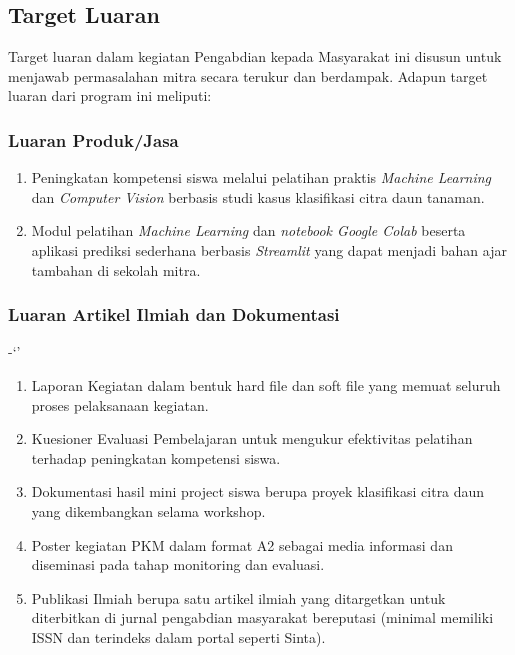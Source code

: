 \subsection{Target Luaran}

Target luaran dalam kegiatan Pengabdian kepada Masyarakat ini disusun untuk menjawab permasalahan mitra secara terukur dan berdampak. Adapun target luaran dari program ini meliputi:

\subsubsection{Luaran Produk/Jasa}
\begin{enumerate}[label=\alph*), leftmargin=*]
    \item Peningkatan kompetensi siswa melalui pelatihan praktis \textit{Machine Learning} dan \textit{Computer Vision} berbasis studi kasus klasifikasi citra daun tanaman.
    \item Modul pelatihan \textit{Machine Learning} dan \textit{notebook Google Colab} beserta aplikasi prediksi sederhana berbasis \textit{Streamlit} yang dapat menjadi bahan ajar tambahan di sekolah mitra.
\end{enumerate}

\subsubsection{Luaran Artikel Ilmiah dan Dokumentasi}-`'
\begin{enumerate}[label=\alph*), leftmargin=*]
    \item Laporan Kegiatan dalam bentuk hard file dan soft file yang memuat seluruh proses pelaksanaan kegiatan.
    \item Kuesioner Evaluasi Pembelajaran untuk mengukur efektivitas pelatihan terhadap peningkatan kompetensi siswa.
    \item Dokumentasi hasil mini project siswa berupa proyek klasifikasi citra daun yang dikembangkan selama workshop.
    \item Poster kegiatan PKM dalam format A2 sebagai media informasi dan diseminasi pada tahap monitoring dan evaluasi.
    \item Publikasi Ilmiah berupa satu artikel ilmiah yang ditargetkan untuk diterbitkan di jurnal pengabdian masyarakat bereputasi (minimal memiliki ISSN dan terindeks dalam portal seperti Sinta).
\end{enumerate}
